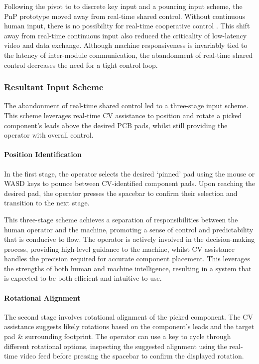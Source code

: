 \documentclass[12pt,british,UKenglish]{article}
\begin{document}
Following the pivot to to discrete key input and a pouncing input scheme, the \ac{PnP} prototype moved away from real-time shared control.
Without continuous human input, there is no possibility for real-time cooperative control \cite{D.2018,C.2019}.
This shift away from real-time continuous input also reduced the criticality of low-latency video and data exchange.
Although machine responsiveness is invariably tied to the latency of inter-module communication, the abandonment of real-time shared control decreases the need for a tight control loop.

\subsubsection{Resultant Input Scheme}

The abandonment of real-time shared control led to a three-stage input scheme.
This scheme leverages real-time \ac{CV} assistance to position and rotate a picked component's leads above the desired \ac{PCB} pads, whilst still providing the operator with overall control.

\paragraph{Position Identification}
In the first stage, the operator selects the desired `pinned' pad using the mouse or WASD keys to pounce between \ac{CV}-identified component pads.
Upon reaching the desired pad, the operator presses the spacebar to confirm their selection and transition to the next stage.

This three-stage scheme achieves a separation of responsibilities between the human operator and the machine, promoting a sense of control and predictability that is conducive to flow.
The operator is actively involved in the decision-making process, providing high-level guidance to the machine, whilst \ac{CV} assistance handles the precision required for accurate component placement.
This leverages the strengths of both human and machine intelligence, resulting in a system that is expected to be both efficient and intuitive to use.

\paragraph{Rotational Alignment}
The second stage involves rotational alignment of the picked component.
The \ac{CV} assistance suggests likely rotations based on the component's leads and the target pad \& surrounding footprint.
The operator can use a key to cycle through different rotational options, inspecting the suggested alignment using the real-time video feed before pressing the spacebar to confirm the displayed rotation.
\end{document}
